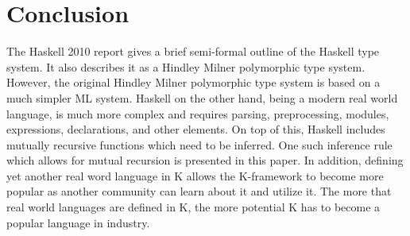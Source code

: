 \chapter{Conclusion}

The Haskell 2010 report gives a brief semi-formal outline of the Haskell type system. It also describes it as a Hindley Milner polymorphic type system. However, the original Hindley Milner polymorphic type system is based on a much simpler ML system. Haskell on the other hand, being a modern real world language, is much more complex and requires parsing, preprocessing, modules, expressions, declarations, and other elements. On top of this, Haskell includes mutually recursive functions which need to be inferred. One such inference rule which allows for mutual recursion is presented in this paper. In addition, defining yet another real word language in K allows the K-framework to become more popular as another community can learn about it and utilize it. The more that real world languages are defined in K, the more potential K has to become a popular language in industry.